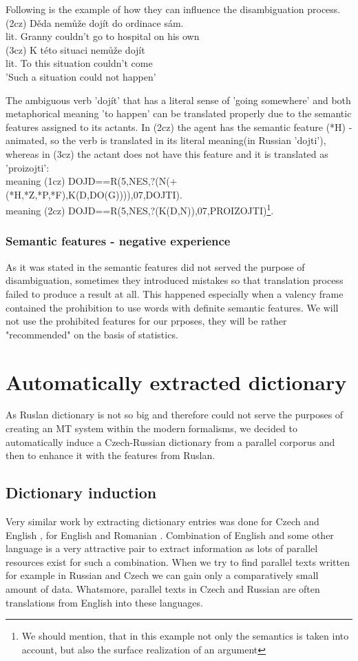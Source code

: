 \documentclass[10pt,a5paper,twoside]{article}
\begin{document}
Following is the example of how they can influence the disambiguation process.\\
(2cz) Děda    nemůže   dojít do ordinace sám.\\
lit.  Granny  couldn't go    to hospital on his own\\
(3cz) K  této situaci   nemůže   dojít\\
lit.  To this situation couldn't come\\
'Such a situation could not happen'

The ambiguous verb 'dojít' that has a literal sense of 'going somewhere'
and both metaphorical meaning 'to happen' can be translated properly
due to the semantic features assigned to its actants. In (2cz) the 
agent has the semantic feature (*H) - animated, so the verb is translated
in its literal meaning(in Russian 'dojti'), whereas in (3cz) the actant does not have this feature
and it is translated as 'proizojti':\\
meaning (1cz) DOJD==R(5,NES,?(N(+(*H,*Z,*P,*F),K(D,DO(G)))),07,DOJTI).\\
meaning (2cz) DOJD==R(5,NES,?(K(D,N)),07,PROIZOJTI)\footnote{We should mention, that in this example 
not only the semantics is taken into account, but also the surface realization of an argument}.\\


\subsubsection{Semantic features - negative experience}
As it was stated in \cite{KubonPHD2001} the semantic features did not
served the purpose of disambiguation, sometimes they introduced mistakes
so that translation process failed to produce a result at all. This 
happened especially when a valency frame contained the prohibition 
to use words with definite semantic features. 
We will not use the prohibited features for our prposes, they will be rather "recommended" on the basis of
statistics. 


\section{Automatically extracted dictionary}
As Ruslan dictionary is not so big and therefore 
could not serve the purposes of creating an MT system within the modern formalisms,
we decided to automatically induce a Czech-Russian dictionary
from a parallel corporus and then to enhance it with the features from Ruslan.
\subsection{Dictionary induction}
Very similar work by extracting dictionary entries was done for
Czech and English \cite{bojar:prokopova}, for English and Romanian \cite{tufis}.
Combination of English and some other language is a very attractive
pair to extract information as lots of parallel resources exist
for such a combination.
When we try to find parallel texts written for example in Russian and Czech
 we can gain only a comparatively small amount of data. Whatsmore,
parallel texts
in Czech and Russian are often translations from English into these languages.
\end{document}
